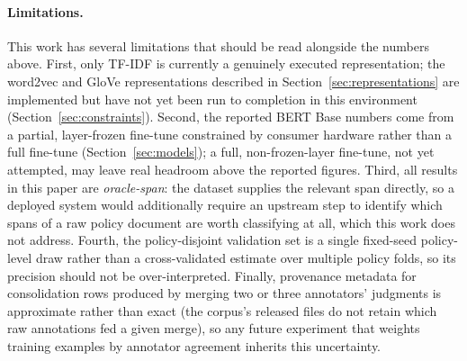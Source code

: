 \documentclass[11pt]{acl}
\begin{document}
\paragraph{Limitations.} This work has several limitations that should be read
alongside the numbers above. First, only TF-IDF is currently a genuinely executed
representation; the word2vec and GloVe representations described in
Section~\ref{sec:representations} are implemented but have not yet been run to
completion in this environment (Section~\ref{sec:constraints}). Second, the reported
BERT Base numbers come from a partial, layer-frozen fine-tune constrained by consumer
hardware rather than a full fine-tune (Section~\ref{sec:models}); a full, non-frozen-layer
fine-tune, not yet attempted, may leave real headroom above the reported figures. Third,
all results in this paper are
\emph{oracle-span}: the dataset supplies the relevant span directly, so a deployed
system would additionally require an upstream step to identify which spans of a raw
policy document are worth classifying at all, which this work does not address. Fourth,
the policy-disjoint validation set is a single fixed-seed policy-level draw rather than
a cross-validated estimate over multiple policy folds, so its precision should not be
over-interpreted. Finally, provenance metadata for consolidation rows produced by
merging two or three annotators' judgments is approximate rather than exact
(the corpus's released files do not retain which raw annotations fed a given merge), so
any future experiment that weights training examples by annotator agreement inherits
this uncertainty.
\end{document}
